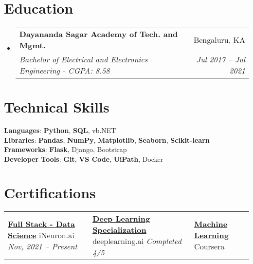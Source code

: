 \documentclass[letterpaper,11pt]{article}
\makeatletter
\newcommand{\resumeSubheading}[4]{
  \vspace{-2pt}\item
    \begin{tabular*}{0.97\textwidth}[t]{l@{\extracolsep{\fill}}r}
      \textbf{#1} & #2 \\
      \textit{\small#3} & \textit{\small #4} \\
    \end{tabular*}\vspace{-7pt}
}
\newcommand{\resumeSubHeadingListStart}{\begin{itemize}[leftmargin=0.15in, label={}]}
\newcommand{\resumeSubHeadingListEnd}{\end{itemize}}
\makeatother
\begin{document}
\section{Education}
  \resumeSubHeadingListStart
    \resumeSubheading
      {Dayananda Sagar Academy of Tech. and Mgmt.}{Bengaluru, KA}
      {Bachelor of Electrical and Electronics Engineering - CGPA: 8.58}{Jul 2017 -- Jul 2021}
  \resumeSubHeadingListEnd

\section{Technical Skills}
 \begin{itemize}[leftmargin=0.15in, label={}]
    \small{\item{
     \textbf{Languages}{: {\bfseries{Python}}, 
                          {\bfseries{SQL}}, 
                          {vb.NET}} \\
     \textbf{Libraries}{: {\bfseries{Pandas}}, 
                          {\bfseries{NumPy}},
                          {\bfseries{Matplotlib}},
                          {\bfseries{Seaborn}},
                          {\bfseries{Scikit-learn}}}\\
     \textbf{Frameworks}{: {\bfseries{Flask}},
                          {Django}},
                          {Bootstrap} \\
     \textbf{Developer Tools}{: 
                          {\bfseries{Git}},
                          {\bfseries{VS Code}},
                          {\bfseries{UiPath}}, 
                          {Docker}} \\
    }}
 \end{itemize}

\section{Certifications}
 \begin{itemize}[leftmargin=0.15in, label={}]

\begin{tabularx}{\linewidth}{ @{} X X X @{} }
    \href{https://ineuron.ai/course/Full-Stack-Data-Science-Nov'21-Batch}
    {\bfseries{Full Stack - Data Science}}\hfill \break
    iNeuron.ai\hfill \break
    {\textit{Nov, 2021 -- Present}}

    &
    
    \href{https://drive.google.com/file/d/1nlAGjIDLMqbXyDVl-Py22eLMO2MyzlGz/view?usp=sharing}
    {\bfseries{Deep Learning Specialization}}\hfill \break
    deeplearning.ai\hfill \break
    {\textit{Completed 4/5}}

    &
    
    \href{https://www.coursera.org/learn/machine-learning}
    {\bfseries{Machine Learning}}\hfill \break
    Coursera
\end{tabularx}
 \end{itemize}
\end{document}
